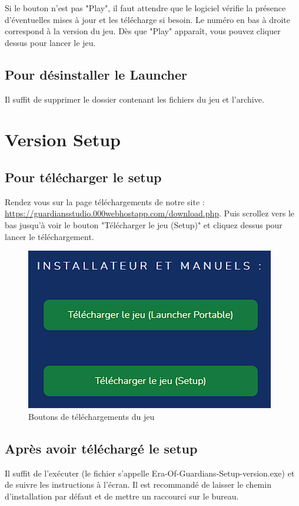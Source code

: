 \documentclass[a4paper, 12pt]{article}
\begin{document}
	Si le bouton n'est pas "Play", il faut attendre que le logiciel vérifie la présence d'éventuelles mises à jour et les télécharge si besoin. Le numéro en bas à droite correspond à la version du jeu. Dès que "Play" apparaît, vous pouvez cliquer dessus pour lancer le jeu.
	
	
	
	\subsection{Pour désinstaller le Launcher}
	Il suffit de supprimer le dossier contenant les fichiers du jeu et l'archive.
	
	\section{Version Setup}
	\subsection{Pour télécharger le setup}
	Rendez vous sur la page téléchargements de notre site :
	\url{https://guardiansstudio.000webhostapp.com/download.php}.
	Puis scrollez vers le bas jusqu'à voir le bouton "Télécharger le jeu (Setup)" et cliquez dessus pour lancer le téléchargement.
	
	\begin{figure}[ht]
		\centering
		\includegraphics[scale=0.6]{images/download_launcher.png}
		\caption{Boutons de téléchargements du jeu}
	\end{figure}
	
	\subsection{Après avoir téléchargé le setup}
	Il suffit de l'exécuter (le fichier s'appelle Era-Of-Guardians-Setup-version.exe) et de suivre les instructions à l'écran.
	Il est recommandé de laisser le chemin d'installation par défaut et de mettre un raccourci sur le bureau.
\end{document}
